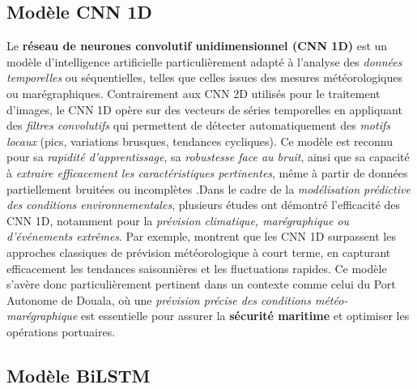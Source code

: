 \documentclass[a4paper,12pt,openany]{report}
\begin{document}
	
	\subsection{Modèle CNN 1D}
	
	Le \textbf{réseau de neurones convolutif unidimensionnel (CNN 1D)} est un modèle d’intelligence artificielle particulièrement adapté à l'analyse des \textit{données temporelles} ou séquentielles, telles que celles issues des mesures météorologiques ou marégraphiques. Contrairement aux CNN 2D utilisés pour le traitement d’images, le CNN 1D opère sur des vecteurs de séries temporelles en appliquant des \textit{filtres convolutifs} qui permettent de détecter automatiquement des \textit{motifs locaux} (pics, variations brusques, tendances cycliques). Ce modèle est reconnu pour sa \textit{rapidité d’apprentissage}, sa \textit{robustesse face au bruit}, ainsi que sa capacité à \textit{extraire efficacement les caractéristiques pertinentes}, même à partir de données partiellement bruitées ou incomplètes \cite{Kiranyaz2015}.Dans le cadre de la \textit{modélisation prédictive des conditions environnementales}, plusieurs études ont démontré l'efficacité des CNN 1D, notamment pour la \textit{prévision climatique, marégraphique ou d’événements extrêmes}. Par exemple,\cite{Yu2022} montrent que les CNN 1D surpassent les approches classiques de prévision météorologique à court terme, en capturant efficacement les tendances saisonnières et les fluctuations rapides. Ce modèle s’avère donc particulièrement pertinent dans un contexte comme celui du Port Autonome de Douala, où une \textit{prévision précise des conditions météo-marégraphique} est essentielle pour assurer la \textbf{sécurité maritime} et optimiser les opérations portuaires. 
	

		\subsection{Modèle BiLSTM}
		
\end{document}
